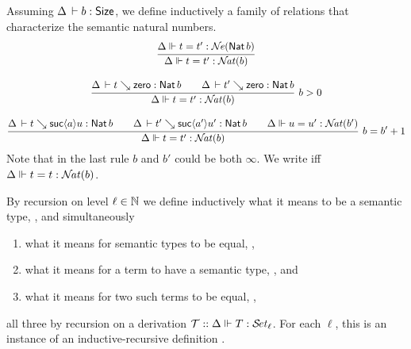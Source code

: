 \documentclass[acmlarge,review,anonymous]{acmart}\settopmatter{printfolios=true}
\begin{document}
Assuming $\Delta \,\vdash b : \mathsf{Size}$, we define inductively a family  of relations that characterize the semantic natural numbers.
\begin{gather*}
  \ru{\sneq \Delta t {t'} {\Nat b}
    }{\snateq \Delta t {t'} b
    }
\\[2ex]
  \rux{\Delta \der t \evalsto \tzero : \Nat b \qquad
      \Delta \der t' \evalsto \tzero : \Nat b
    }{\snateq \Delta t {t'} b
    }{b > 0}
\\[2ex]
  \rux{\Delta \der t \evalsto \suc a u : \Nat b \qquad
      \Delta \der t' \evalsto \suc{a'}{u'} : \Nat b \qquad
      \snateq \Delta u {u'} {b'}
    }{\snateq \Delta t {t'} b
    }{b = b' + 1}
\end{gather*}
Note that in the last rule $b$ and $b'$ could be both $\infty$.
We write  iff $\Delta \Vdash t = t : {\mathcal{N}\!\mathit{at}}(b)$.

By recursion on level $\ell \in \mathbb{N}$ we define inductively what it means to be a semantic type, , and simultaneously
\begin{enumerate}
\item what it means for semantic types to be equal, ,
\item what it means for a term to have a semantic type, , and
\item what it means for two such terms to be equal, ,
\end{enumerate}
all three by recursion on a derivation $\mathcal{T} :: \Delta \Vdash T : {\mathcal{S}\!\mathit{et}_{\ell}}$.
For each $\ell$, this is an instance of an inductive-recursive definition \cite{dybjer:jsl00}.
\end{document}
